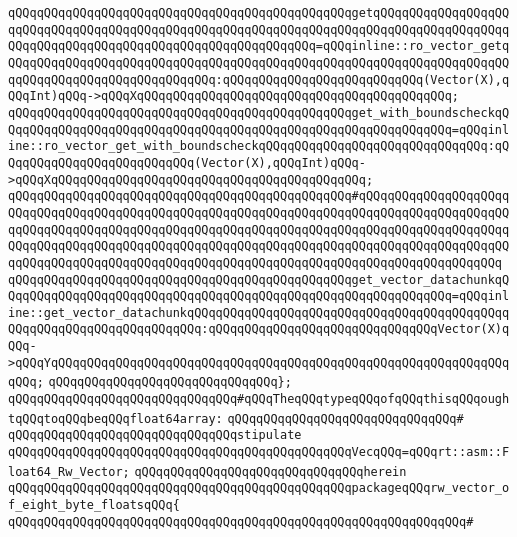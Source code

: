 \verb|qQQqqQQqqQQqqQQqqQQqqQQqqQQqqQQqqQQqqQQqqQQqqQQqgetqQQqqQQqqQQqqQQqqQQqqQQqqQQqqQQqqQQqqQQqqQQqqQQqqQQqqQQqqQQqqQQqqQQqqQQqqQQqqQQqqQQqqQQqqQQqqQQqqQQqqQQqqQQqqQQqqQQqqQQqqQQqqQQqqQQq=qQQqinline::ro_vector_getqQQqqQQqqQQqqQQqqQQqqQQqqQQqqQQqqQQqqQQqqQQqqQQqqQQqqQQqqQQqqQQqqQQqqQQqqQQqqQQqqQQqqQQqqQQqqQQqqQQq:qQQqqQQqqQQqqQQqqQQqqQQqqQQq(Vector(X),qQQqInt)qQQq->qQQqXqQQqqQQqqQQqqQQqqQQqqQQqqQQqqQQqqQQqqQQqqQQq;|\newline
\verb|qQQqqQQqqQQqqQQqqQQqqQQqqQQqqQQqqQQqqQQqqQQqqQQqget_with_boundscheckqQQqqQQqqQQqqQQqqQQqqQQqqQQqqQQqqQQqqQQqqQQqqQQqqQQqqQQqqQQqqQQq=qQQqinline::ro_vector_get_with_boundscheckqQQqqQQqqQQqqQQqqQQqqQQqqQQqqQQq:qQQqqQQqqQQqqQQqqQQqqQQqqQQq(Vector(X),qQQqInt)qQQq->qQQqXqQQqqQQqqQQqqQQqqQQqqQQqqQQqqQQqqQQqqQQqqQQq;|\newline
\verb|qQQqqQQqqQQqqQQqqQQqqQQqqQQqqQQqqQQqqQQqqQQqqQQq#qQQqqQQqqQQqqQQqqQQqqQQqqQQqqQQqqQQqqQQqqQQqqQQqqQQqqQQqqQQqqQQqqQQqqQQqqQQqqQQqqQQqqQQqqQQqqQQqqQQqqQQqqQQqqQQqqQQqqQQqqQQqqQQqqQQqqQQqqQQqqQQqqQQqqQQqqQQqqQQqqQQqqQQqqQQqqQQqqQQqqQQqqQQqqQQqqQQqqQQqqQQqqQQqqQQqqQQqqQQqqQQqqQQqqQQqqQQqqQQqqQQqqQQqqQQqqQQqqQQqqQQqqQQqqQQqqQQqqQQqqQQqqQQqqQQqqQQqqQQq|\newline
\verb|qQQqqQQqqQQqqQQqqQQqqQQqqQQqqQQqqQQqqQQqqQQqqQQqget_vector_datachunkqQQqqQQqqQQqqQQqqQQqqQQqqQQqqQQqqQQqqQQqqQQqqQQqqQQqqQQqqQQqqQQq=qQQqinline::get_vector_datachunkqQQqqQQqqQQqqQQqqQQqqQQqqQQqqQQqqQQqqQQqqQQqqQQqqQQqqQQqqQQqqQQqqQQqqQQq:qQQqqQQqqQQqqQQqqQQqqQQqqQQqqQQqVector(X)qQQq->qQQqYqQQqqQQqqQQqqQQqqQQqqQQqqQQqqQQqqQQqqQQqqQQqqQQqqQQqqQQqqQQqqQQqqQQq;|\newline
\verb|qQQqqQQqqQQqqQQqqQQqqQQqqQQqqQQq};|\newline
\newline
\verb|qQQqqQQqqQQqqQQqqQQqqQQqqQQqqQQq#qQQqTheqQQqtypeqQQqofqQQqthisqQQqoughtqQQqtoqQQqbeqQQqfloat64array:|\newline
\verb|qQQqqQQqqQQqqQQqqQQqqQQqqQQqqQQq#|\newline
\verb|qQQqqQQqqQQqqQQqqQQqqQQqqQQqqQQqstipulate|\newline
\verb|qQQqqQQqqQQqqQQqqQQqqQQqqQQqqQQqqQQqqQQqqQQqqQQqVecqQQq=qQQqrt::asm::Float64_Rw_Vector;|\newline
\verb|qQQqqQQqqQQqqQQqqQQqqQQqqQQqqQQqherein|\newline
\newline
\verb|qQQqqQQqqQQqqQQqqQQqqQQqqQQqqQQqqQQqqQQqqQQqqQQqpackageqQQqrw_vector_of_eight_byte_floatsqQQq{|\newline
\verb|qQQqqQQqqQQqqQQqqQQqqQQqqQQqqQQqqQQqqQQqqQQqqQQqqQQqqQQqqQQqqQQq#|\newline
